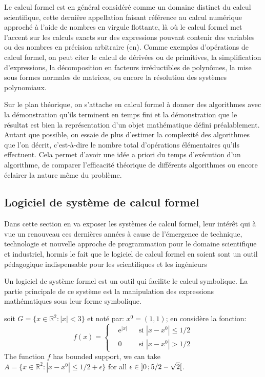 Le calcul formel est en général considéré comme un domaine distinct du calcul scientifique, cette dernière appellation faisant référence au calcul numérique approché à l'aide de nombres en virgule flottante, là où le calcul formel met l'accent sur les calculs exacts sur des expressions pouvant contenir des variables ou des nombres en précision arbitraire (en). Comme exemples d'opérations de calcul formel, on peut citer le calcul de dérivées ou de primitives, la simplification d'expressions, la décomposition en facteurs irréductibles de polynômes, la mise sous formes normales de matrices, ou encore la résolution des systèmes polynomiaux.

Sur le plan théorique, on s'attache en calcul formel à donner des algorithmes avec la démonstration qu'ils terminent en temps fini et la démonstration que le résultat est bien la représentation d'un objet mathématique défini préalablement. Autant que possible, on essaie de plus d'estimer la complexité des algorithmes que l'on décrit, c'est-à-dire le nombre total d'opérations élémentaires qu'ils effectuent. Cela permet d'avoir une idée a priori du temps d'exécution d'un algorithme, de comparer l'efficacité théorique de différents algorithmes ou encore éclairer la nature même du problème.
\subsection{Logiciel de système de calcul formel}
Dans cette section en va exposer les systèmes de calcul formel, leur intérêt qui à vue un renouveau ces dernières années à cause de l'émergence de technique, technologie et nouvelle approche de programmation pour le domaine scientifique et industriel, hormis le fait que le logiciel de calcul formel en soient sont un outil pédagogique 
indispensable pour les scientifiques et les ingénieurs

\begin{definition}
Un logiciel de système formel est un outil qui facilite le calcul symbolique. La partie principale de ce système est la manipulation des expressions mathématiques sous leur forme symbolique.
\end{definition}

\begin{example}
soit $G=\{x\in\mathbb{R}^2:|x|<3\}$ et noté par: $x^0=(1,1)$; en considère la fonction:
\begin{equation}
f(x)=\left\{\begin{aligned} & \mathrm{e}^{|x|} & & \text{si $|x-x^0|\leq 1/2$}\\
& 0 & & \text{si $|x-x^0|> 1/2$}\end{aligned}\right.
\end{equation}
The function $f$ has bounded support, we can take $A=\{x\in\mathbb{R}^2:|x-x^0|\leq 1/2+\epsilon\}$ for all $\epsilon\in\mathopen{]}0\,;5/2-\sqrt{2}\mathclose{[}$.
\end{example}

